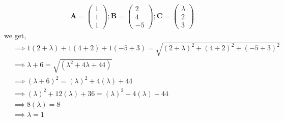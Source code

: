 \documentclass[11pt, a4paper]{article}
\newcommand{\myvec}[1]{\ensuremath{\begin{pmatrix}#1\end{pmatrix}}}
\let\vec\mathbf
\providecommand{\brak}[1]{\ensuremath{\left(#1\right)}}
\begin{document}
\begin{enumerate}
\begin{align*}
\vec{A}=\myvec{1\\1\\1};\vec{B}=\myvec{2\\4\\-5};\vec{C}=\myvec{\lambda\\2\\3}
\end{align*}
we get,
\begin{align}   
&\implies 1\brak{2+\lambda}+1\brak{4+2}+1\brak{-5+3}=\sqrt{\brak{2+\lambda}^2+\brak{4+2}^2+\brak{-5+3}^2}\\
& \implies \lambda +6 = \sqrt{\brak{\lambda ^2+4 \lambda +44}}\\
& \implies\brak{ \lambda +6}^2 = \brak{\lambda} ^2+4 \brak{\lambda} +44\\
& \implies \brak{\lambda}^2+12\brak{ \lambda }+36 = \brak{ \lambda }^2+4 \brak{\lambda} +44\\
& \implies  8\brak{\lambda} = 8\\
 &\implies \lambda = 1
\end{align}
\end{enumerate}
\end{document}

